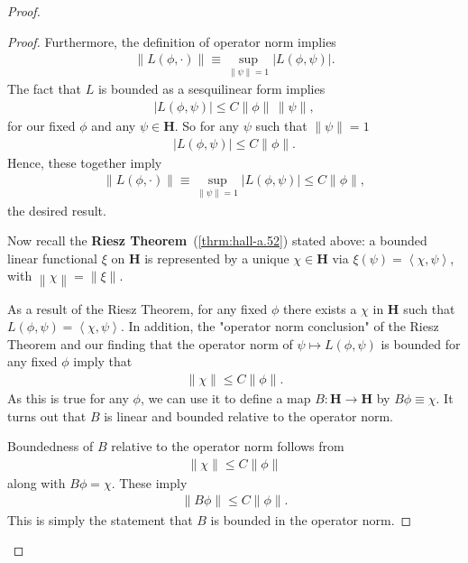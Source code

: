 \begin{proof}
\begin{proof}
Furthermore, the definition of operator norm implies
\begin{align}
    \|L(\phi, \cdot)\| \equiv \sup\limits_{\|\psi\| = 1} \lvert L(\phi, \psi) \rvert.
\end{align}
The fact that $L$ is bounded as a sesquilinear form implies
\begin{align}
    \left\lvert L(\phi, \psi) \right\rvert \le C \|\phi\| \, \|\psi\|,
\end{align}
for our fixed $\phi$ and any $\psi \in \mathbf{H}$. So for any $\psi$ such that $\|\psi\| = 1$
\begin{align}
    \left\lvert L(\phi, \psi) \right\rvert \le C \|\phi\|.
\end{align}
Hence, these together imply
\begin{align}
    \|L(\phi, \cdot)\| \equiv \sup\limits_{\|\psi\| = 1} \lvert L(\phi, \psi) \rvert \le C \|\phi\|,
\end{align}
the desired result.

Now recall the \textbf{Riesz Theorem}~(\ref{thrm:hall-a.52}) stated above: a bounded linear functional $\xi$ on $\mathbf{H}$ is represented by a unique $\chi \in \mathbf{H}$ via $\xi(\psi) = \left< \chi, \psi \right>$, with $\left\| \chi \right\| = \left\| \xi \right\|$.

As a result of the Riesz Theorem, for any fixed $\phi$ there exists a $\chi$ in $\mathbf{H}$ such that $L(\phi, \psi) = \left< \chi, \psi \right>$. In addition, the "operator norm conclusion" of the Riesz Theorem and our finding that the operator norm of $\psi \mapsto L(\phi, \psi)$ is bounded for any fixed $\phi$ imply that
\begin{align}
    \|\chi\| \le C \|\phi\|.
\end{align}
As this is true for any $\phi$, we can use it to define a map $B : \mathbf{H} \rightarrow \mathbf{H}$ by $B\phi \equiv \chi$. It turns out that $B$ is linear and bounded relative to the operator norm.

Boundedness of $B$ relative to the operator norm follows from
\begin{align}
    \|\chi\| \le C \|\phi\|
\end{align}
along with $B\phi = \chi$. These imply
\begin{align}
    \|B\phi\| \le C \|\phi\|.
\end{align}
This is simply the statement that $B$ is bounded in the operator norm.


\end{proof}
\end{proof}
